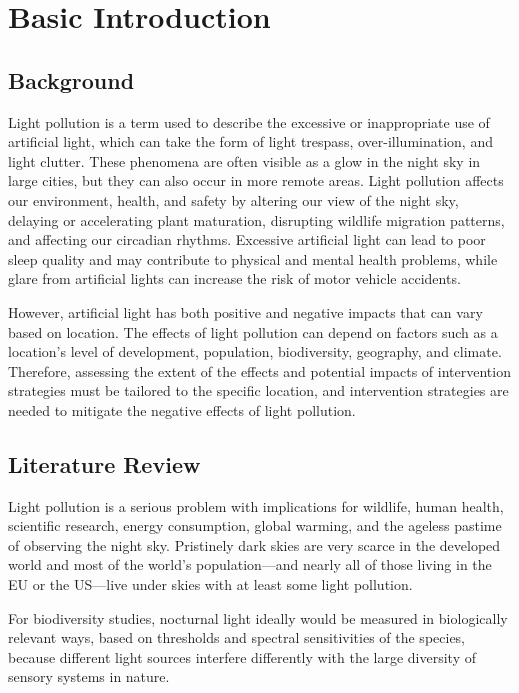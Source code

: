 \MinParskip{}

\section{Basic Introduction}

\subsection{Background}
Light pollution is a term used to describe the excessive or inappropriate use of artificial light, which can take the form of light trespass, over-illumination, and light clutter. These phenomena are often visible as a glow in the night sky in large cities, but they can also occur in more remote areas. Light pollution affects our environment, health, and safety by altering our view of the night sky, delaying or accelerating plant maturation, disrupting wildlife migration patterns, and affecting our circadian rhythms. Excessive artificial light can lead to poor sleep quality and may contribute to physical and mental health problems, while glare from artificial lights can increase the risk of motor vehicle accidents.

However, artificial light has both positive and negative impacts that can vary based on location. The effects of light pollution can depend on factors such as a location's level of development, population, biodiversity, geography, and climate. Therefore, assessing the extent of the effects and potential impacts of intervention strategies must be tailored to the specific location, and intervention strategies are needed to mitigate the negative effects of light pollution.


\subsection{Literature Review}
Light pollution is a serious problem with implications for wildlife, human health, scientific research, energy consumption, global warming, and the ageless pastime of observing the night sky. Pristinely dark skies are very scarce in the developed world and most of the world's population—and nearly all of those living in the EU or the US—live under skies with at least some light pollution\cite{GALLAWAY2010658}. 

For biodiversity studies, nocturnal light ideally would be measured in biologically relevant ways, based on thresholds and spectral sensitivities of the species, because different light sources interfere differently with the large diversity of sensory systems in nature\cite{davies2013artificial}. 

